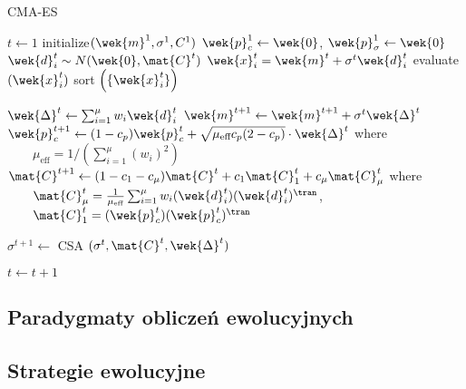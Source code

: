 \begin{algorithm}[h]
\caption{CMA-ES}
\label{alg-CMA-ES}
\begin{algorithmic}[1]
\STATE $t \gets 1$
\STATE initialize$(\wek{m}^1,\sigma^1, C^1)$
\STATE $\wek{p}_c^1 \gets \wek{0}$, $\wek{p}_\sigma^1 \gets \wek{0}$
      \STATE $ \wek{d}_i^t \sim N(\wek{0}, \mat{C}^t) $
      \STATE $\wek{x}_i^t=\wek{m}^{t} + \sigma^t \wek{d}_i^t $
      \STATE evaluate $(\wek{x}_i^t)$
   \ENDFOR
   \STATE sort $ \left(\{ \wek{x}_i^t \} \right) $
  
   \STATE $\wek{\Delta}^{t} \gets \sum_{i=1}^\mu w_i \wek{d}_i^t $
   \STATE $\wek{m}^{t+1} \gets \wek{m}^{t+1} + \sigma^t \wek{\Delta}^{t} $
   \STATE $\wek{p}_c^{t+1} \gets (1-c_p)\wek{p}_c^t + \sqrt{\mu_\text{eff} c_p(2-c_p)} \cdot \wek{\Delta}^{t}$ where \newline
          $\qquad \mu_\text{eff}=1/\left(\sum_{i=1}^\mu (w_i)^2\right)$
   \STATE $\mat{C}^{t+1} \gets (1-c_1-c_\mu)\mat{C}^t + c_1 \mat{C}^t_1 + c_\mu  \mat{C}^t_\mu$ where \newline
$\qquad \mat{C}_\mu^t=\frac{1}{\mu_\text{eff}}\sum_{i=1}^\mu w_i(\wek{d}_i^t)(\wek{d}_i^t)^\tran$, \newline
$\qquad \mat{C}_1^t=(\wek{p}_c^t)(\wek{p}_c^t)^\tran$

   \STATE $\sigma^{t+1} \gets $ CSA $(\sigma^t, \mat{C}^{t}, \wek{\Delta}^{t})$ 
      
   \STATE $t \gets t+1$
\ENDWHILE

\end{algorithmic}
\end{algorithm}




\subsection{Paradygmaty obliczeń ewolucyjnych}
\subsection{Strategie ewolucyjne}


